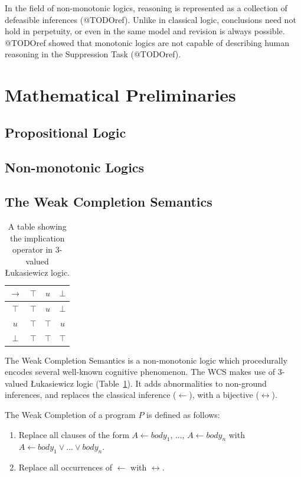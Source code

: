 \documentclass{article}
\begin{document}
In the field of non-monotonic logics, reasoning is represented as a collection of defeasible inferences (@TODOref). Unlike in classical logic, conclusions need not hold in perpetuity, or even in the same model and revision is always possible. @TODOref showed that monotonic logics are not capable of describing human reasoning in the Suppression Task (@TODOref).
\section{Mathematical Preliminaries}
\subsection{Propositional Logic}
\subsection{Non-monotonic Logics}
\subsection{The Weak Completion Semantics}
\begin{table}
\begin{center}


\begin{tabular}{ c | c c c }
  $\rightarrow$& $\top$ & $u$ & $\bot$ \\ \hline
 $\top$ & $\top$ & $u$ & $\bot$ \\  
 $u$ & $\top$ & $\top$ & $u$\\  
 $\bot$ & $\top$ & $\top$ & $\top$
\end{tabular}
\caption{A table showing the implication operator in 3-valued \L ukasiewicz logic.}
\label{tbl:luk}

\end{center}
\end{table}

The Weak Completion Semantics is a non-monotonic logic which procedurally encodes several well-known cognitive phenomenon. The WCS makes use of 3-valued \L ukasiewicz logic (Table~\ref{tbl:luk}). It adds abnormalities to non-ground inferences, and replaces the classical inference ($\leftarrow$), with a bijective ($\leftrightarrow$). 

The Weak Completion of a program $P$ is defined as follows:

\begin{enumerate}
\item Replace all clauses of the form $A \leftarrow body_1$, ..., $A \leftarrow body_n$ with $A \leftarrow body_1 \lor ... \lor body_n$.
\item Replace all occurrences of $\leftarrow$ with $\leftrightarrow$.
\end{enumerate}
\end{document}
